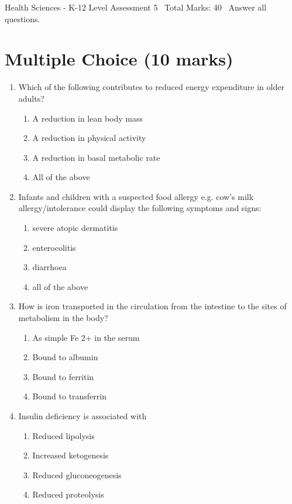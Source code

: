 \documentclass[12pt]{article}
\begin{document}
\begin{center}
Health Sciences - K-12 Level Assessment 5 \
Total Marks: 40 \
Answer all questions.
\end{center}

\section*{Multiple Choice (10 marks)}
\begin{enumerate}[label=\arabic*.]
\item Which of the following contributes to reduced energy expenditure in older adults?
\begin{enumerate}[label=(\alph*)]
    \item A reduction in lean body mass
    \item A reduction in physical activity
    \item A reduction in basal metabolic rate
    \item All of the above
\end{enumerate}
\item Infants and children with a suspected food allergy e.g. cow's milk allergy/intolerance could display the following symptoms and signs:
\begin{enumerate}[label=(\alph*)]
    \item severe atopic dermatitis
    \item enterocolitis
    \item diarrhoea
    \item all of the above
\end{enumerate}
\item How is iron transported in the circulation from the intestine to the sites of metabolism in the body?
\begin{enumerate}[label=(\alph*)]
    \item As simple Fe 2+ in the serum
    \item Bound to albumin
    \item Bound to ferritin
    \item Bound to transferrin
\end{enumerate}
\item Insulin deficiency is associated with
\begin{enumerate}[label=(\alph*)]
    \item Reduced lipolysis
    \item Increased ketogenesis
    \item Reduced gluconeogenesis
    \item Reduced proteolysis

\end{enumerate}
\end{enumerate}
\end{document}
